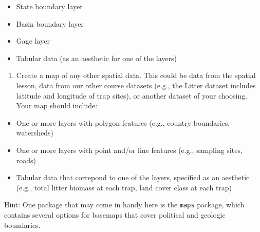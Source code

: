 \documentclass[
]{article}
\providecommand{\tightlist}{%
  \setlength{\itemsep}{0pt}\setlength{\parskip}{0pt}}
\begin{document}
\begin{itemize}
\tightlist
\item
  State boundary layer
\item
  Basin boundary layer
\item
  Gage layer
\item
  Tabular data (as an aesthetic for one of the layers)
\end{itemize}

\begin{enumerate}
\def\labelenumi{\arabic{enumi}.}
\setcounter{enumi}{2}
\tightlist
\item
  Create a map of any other spatial data. This could be data from the
  spatial lesson, data from our other course datasets (e.g., the Litter
  dataset includes latitude and longitude of trap sites), or another
  dataset of your choosing. Your map should include:
\end{enumerate}

\begin{itemize}
\tightlist
\item
  One or more layers with polygon features (e.g., country boundaries,
  watersheds)
\item
  One or more layers with point and/or line features (e.g., sampling
  sites, roads)
\item
  Tabular data that correpond to one of the layers, specified as an
  aesthetic (e.g., total litter biomass at each trap, land cover class
  at each trap)
\end{itemize}

Hint: One package that may come in handy here is the \texttt{maps}
package, which contains several options for basemaps that cover
political and geologic boundaries.
\end{document}
